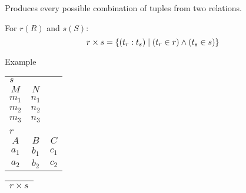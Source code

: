 \begin{multicols}{2}
    \begin{CheatsheetEntryFrame}


        Produces every possible combination of tuples from two relations.

        For $r(R)$ and $s(S)$:
        \begin{equation*}
            r \times s = \left\{{(t_r:t_s)} \mid {(t_r \in r) \wedge (t_s \in s)}\right\}
        \end{equation*}

        \SubsectionFrameRemoveSeparation
        \begin{RelAlgSubsection}{Example}
        \begin{center}
            {\footnotesize%
                \begin{tabular}{|ccc|}
                    \multicolumn{3}{l}{\normalsize $s$}
                        \\ \cline{1-2}
                    \multicolumn{1}{|c}{$M$}
                        & \multicolumn{1}{c|}{$N$}
                        & \multicolumn{1}{c}{} %
                        \\ \cline{1-2} \cline{1-2}
                    $m_1$ & \multicolumn{1}{c|}{$n_1$} & \multicolumn{1}{c}{} \\
                    $m_2$ & \multicolumn{1}{c|}{$n_2$} & \multicolumn{1}{c}{} \\
                    $m_3$ & \multicolumn{1}{c|}{$n_3$} & \multicolumn{1}{c}{} \\ \cline{1-2}
                    \multicolumn{3}{c}{} \\[1.5ex] %
                    \multicolumn{3}{l}{\normalsize $r$}
                        \\ \hline
                    \multicolumn{1}{|c}{$A$}
                        & \multicolumn{1}{c}{$B$}
                        & \multicolumn{1}{c|}{$C$}
                        \\ \hline\hline
                    $a_1$ & $b_1$ & $c_1$ \\
                    $a_2$ & $b_2$ & $c_2$ \\ \hline
                \end{tabular}
                \qquad \quad
                \begin{tabular}{|ccccc|}
                    \multicolumn{5}{l}{\normalsize $r \times s$}
                        \\ \hline

\end{tabular}}
\end{center}
\end{RelAlgSubsection}
\end{CheatsheetEntryFrame}
\end{multicols}
